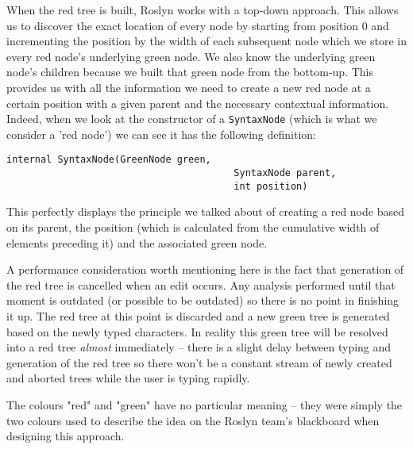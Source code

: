 \medskip

When the red tree is built, Roslyn works with a top-down approach. This allows us to discover the exact location of every node by starting from position 0 and incrementing the position by the width of each subsequent node which we store in every red node's underlying green node. We also know the underlying green node's children because we built that green node from the bottom-up. This provides us with all the information we need to create a new red node at a certain position with a given parent and the necessary contextual information. Indeed, when we look at the constructor of a \verb|SyntaxNode| (which is what we consider a 'red node') we can see it has the following definition:

\begin{lstlisting}
internal SyntaxNode(GreenNode green, 
										SyntaxNode parent, 
										int position)
\end{lstlisting}

This perfectly displays the principle we talked about of creating a red node based on its parent, the position (which is calculated from the cumulative width of elements preceding it) and the associated green node.

\medskip

A performance consideration worth mentioning here is the fact that generation of the red tree is cancelled when an edit occurs. Any analysis performed until that moment is outdated (or possible to be outdated) so there is no point in finishing it up. The red tree at this point is discarded and a new green tree is generated based on the newly typed characters. In reality this green tree will be resolved into a red tree \textit{almost} immediately -- there is a slight delay between typing and generation of the red tree so there won't be a constant stream of newly created and aborted trees while the user is typing rapidly.

The colours "red" and "green" have no particular meaning -- they were simply the two colours used to describe the idea on the Roslyn team's blackboard when designing this approach.\parencite{Lippert2012}

